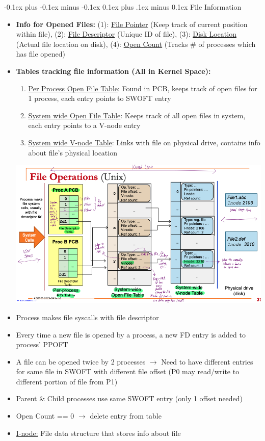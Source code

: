\documentclass[landscape]{article}
\makeatletter
\renewcommand{\subsection}{\@startsection{subsection}{2}{0mm}%
  {-0.1ex plus -0.1ex minus -0.1ex}%
  {0.1ex plus .1ex minus 0.1ex}%
{\normalfont\scriptsize\bfseries}}
\makeatother
\begin{document}
\begin{multicols*}{6}
    \subsection{File Information}
    \begin{itemize}
      \item \textbf{Info for Opened Files:} (1): \underline{File Pointer} (Keep track of current position within file), (2): \underline{File Descriptor} (Unique ID of file), (3): \underline{Disk Location} (Actual file location on disk), (4): \underline{Open Count} (Tracks \# of processes which has file opened)
      \item \textbf{Tables tracking file information (All in Kernel Space):}
      \begin{enumerate}
        \item \underline{Per Process Open File Table}: Found in PCB, keeps track of open files for 1 process, each entry points to SWOFT entry
        \item \underline{System wide Open File Table}: Keeps track of all open files in system, each entry points to a V-node entry
        \item \underline{System wide V-node Table}: Links with file on physical drive, contains info about file's physical location
      \end{enumerate}
      \includegraphics[width=1.0\linewidth]{25_file_tables.png}
      \item Process makes file syscalls with file descriptor
      \item Every time a new file is opened by a process, a new FD entry is added to process' PPOFT
      \item A file can be opened twice by 2 processes $\rightarrow$ Need to have different entries for same file in SWOFT with different file offset (P0 may read/write to different portion of file from P1)
      \item Parent \& Child processes use same SWOFT entry (only 1 offset needed)
      \item Open Count == 0 $\rightarrow$ delete entry from table
      \item \underline{I-node:} File data structure that stores info about file 
    \end{itemize}


\end{multicols*}
\end{document}

